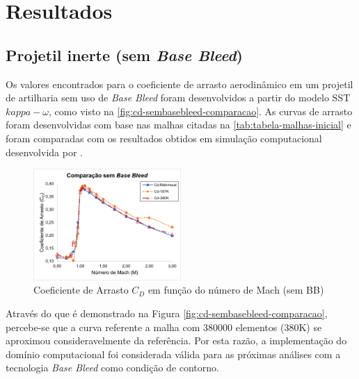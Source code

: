 \chapter{Resultados}\label{cap:resultados}
\graphicspath{{chapter-07/img-cap07/}}

\section{Projetil inerte (sem \textit{Base Bleed})}\label{sec:resultados-sem-basebleed}

Os valores encontrados para o coeficiente de arrasto aerodinâmico em um projetil de artilharia sem uso de \textit{Base Bleed} foram desenvolvidos a partir do modelo SST \(kappa-\omega\), como visto na \autoref{fig:cd-sembasebleed-comparacao}. As curvas de arrasto foram desenvolvidas com base nas malhas citadas na \autoref{tab:tabela-malhas-inicial} e foram comparadas com os resultados obtidos em simulação computacional desenvolvida por \citeauthor{Mahmoud2009}. 

\begin{figure}[!ht]
	\centering
	\includegraphics[width=0.5\textwidth]{cd-sembasebleed-comparacao.png}
	\caption{Coeficiente de Arrasto \(C_{D}\) em função do número de Mach (sem BB)}
	\label{fig:cd-sembasebleed-comparacao}
\end{figure}

Através do que é demonstrado na Figura \autoref{fig:cd-sembasebleed-comparacao}, percebe-se que a curva referente a malha com \num{380000} elementos (380K) se aproximou consideravelmente da referência. Por esta razão, a implementação do domínio computacional foi considerada válida para as próximas análises com a tecnologia \textit{Base Bleed} como condição de contorno.

